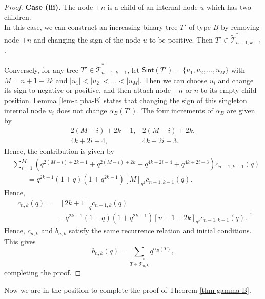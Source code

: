 \documentclass[12pt]{article}
\numberwithin{equation}{section}
\theoremstyle{plain}
\def\Sint{\mathsf{Sint}}
\begin{document}
\begin{proof}
	 				 	
	 				 	
	 				 		\noindent\textbf{Case (iii).}  The node $\pm n$ is a child of an internal node $u$ which  has two children.\\
	 				 	In this case, we can 
	 				 	construct an increasing binary tree $T'$ of type $B$ by   removing  node  $\pm n$ and changing   the sign of  the node $u$ to be positive.   Then $T'\in\widetilde{\mathcal T}_{n-1,k-1}^{*}$.
	 				 	
	 				 	 
	 				 	Conversely,  for any tree $T'\in\widetilde{\mathcal T}_{n-1,k-1}^{*}$, 
	 				 	let $\Sint(T')=\{u_1, u_2, \ldots, u_{M}\}$ with $M=n+1-2k$ and $|u_1|<|u_2|<\ldots<|u_M|$.  Then we can 
	 				 	 choose  $u_i$ and  change its sign to negative or positive, and then attach  node $-n$ or $n$ to its empty child position.  Lemma \ref{lem-alpha-B} states that changing the sign of this singleton internal node $u_i$ does not change $\alpha_B(T')$. The four increments of $\alpha_B$ are given by
	 				 	\[
	 				 	\begin{array}{ll}
	 				 		2(M-i)+2k-1, & 2(M-i)+2k,\\[2mm]
	 				 		4k+2i-4,     & 4k+2i-3.
	 				 	\end{array}
	 				 	\]
	 				 	Hence, the contribution is given by
	 				 	\[
	 				 	\begin{aligned}
	 				 		&\sum_{i=1}^{M} \left( q^{2(M-i)+2k-1}+q^{2(M-i)+2k}
	 				 		+q^{4k+2i-4}+q^{4k+2i-3}
	 				 		\right)c_{n-1,k-1}(q)\\
	 				 		&\qquad =q^{2k-1}(1+q)(1+q^{2k-1}) [M]_{q^2}c_{n-1,k-1}(q).
	 				 	\end{aligned}
	 				 	\]
	 				 	Hence,
	 				 	\[
	 				 	\begin{aligned}
	 				 		c_{n,k}(q) ={}&[2k+1]_q c_{n-1,k}(q)\\
	 				 		&+q^{2k-1}(1+q)(1+q^{2k-1}) [n+1-2k]_{q^2}c_{n-1,k-1}(q).
	 				 	\end{aligned}.
	 				 	\]
	 				 	Hence, $c_{n,k}$ and $b_{n,k}$ satisfy the same recurrence relation and initial conditions. This gives
	 				 	\[
	 				 	b_{n,k}(q)=
	 				 	\sum_{T\in\widetilde{\mathcal T}_{n,k}^{*}}q^{\alpha_B(T)},
	 				 	\]
	 				 	completing the proof.
	 				 	\end{proof}
	 				 	
	 				 	
	 				 	
	 				 	
	 				 	
	 				 	
	 				 	Now we are in the position to complete the proof of Theorem \ref{thm-gamma-B}.
	 				 	
\end{document}
